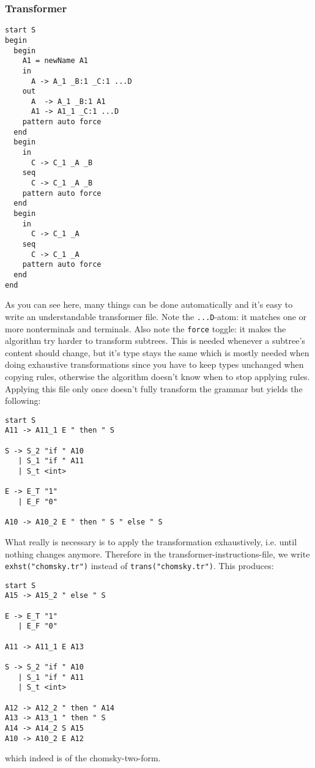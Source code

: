 \documentclass[a4paper]{article}
\begin{document}
\subsubsection*{Transformer}
\begin{lstlisting}[language=transformer]
start S
begin
  begin
    A1 = newName A1
    in
      A -> A_1 _B:1 _C:1 ...D 
    out 
      A  -> A_1 _B:1 A1  
      A1 -> A1_1 _C:1 ...D
    pattern auto force
  end
  begin
    in
      C -> C_1 _A _B
    seq
      C -> C_1 _A _B
    pattern auto force
  end
  begin
    in
      C -> C_1 _A
    seq
      C -> C_1 _A
    pattern auto force
  end
end
\end{lstlisting}
As you can see here, many things can be done automatically and it's easy to write an understandable transformer file. Note the \verb|...D|-atom: it matches one or more nonterminals and terminals. Also note the \verb|force| toggle: it makes the algorithm try harder to transform subtrees. This is needed whenever a subtree's content should change, but it's type stays the same which is mostly needed when doing exhaustive transformations since you have to keep types unchanged when copying rules, otherwise the algorithm doesn't know when to stop applying rules.\\
Applying this file only once doesn't fully transform the grammar but yields the following:
\begin{lstlisting}[language=grammar]
start S
A11 -> A11_1 E " then " S

S -> S_2 "if " A10
   | S_1 "if " A11
   | S_t <int>

E -> E_T "1"
   | E_F "0"

A10 -> A10_2 E " then " S " else " S
\end{lstlisting}
What really is necessary is to apply the transformation exhaustively, i.e. until nothing changes anymore. Therefore in the transformer-instructions-file, we write \verb|exhst("chomsky.tr")| instead of \verb|trans("chomsky.tr")|. This produces:
\begin{lstlisting}[language=grammar]
start S
A15 -> A15_2 " else " S

E -> E_T "1"
   | E_F "0"

A11 -> A11_1 E A13

S -> S_2 "if " A10
   | S_1 "if " A11
   | S_t <int>

A12 -> A12_2 " then " A14
A13 -> A13_1 " then " S
A14 -> A14_2 S A15
A10 -> A10_2 E A12
\end{lstlisting}
which indeed is of the chomsky-two-form.
\end{document}
